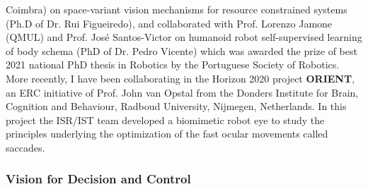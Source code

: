 \documentclass[
]{article}
\begin{document}
Coimbra) on space-variant vision mechanisms for resource constrained
systems (Ph.D of Dr. Rui Figueiredo), and collaborated with Prof.
Lorenzo Jamone (QMUL) and Prof. José Santos-Victor on humanoid robot
self-supervised learning of body schema (PhD of Dr. Pedro Vicente) which
was awarded the prize of best 2021 national PhD thesis in Robotics by
the Portuguese Society of Robotics. More recently, I have been
collaborating in the Horizon 2020 project \textbf{ORIENT}, an ERC
initiative of Prof. John van Opstal from the Donders Institute for
Brain, Cognition and Behaviour, Radboud University, Nijmegen,
Netherlands. In this project the ISR/IST team developed a biomimetic
robot eye to study the principles underlying the optimization of the
fast ocular movements called saccades.

\subsubsection*{Vision for Decision and
Control}\label{vision-for-decision-and-control}
\end{document}
